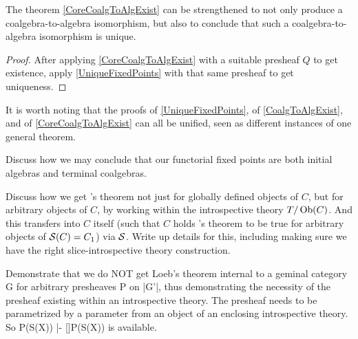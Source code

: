 \begin{theorem}
The theorem \cref{CoreCoalgToAlgExist} can be strengthened to not only produce a coalgebra-to-algebra isomorphism, but also to conclude that such a coalgebra-to-algebra isomorphism is unique.
\end{theorem}
\begin{proof}
After applying \cref{CoreCoalgToAlgExist} with a suitable presheaf $Q$ to get existence, apply \cref{UniqueFixedPoints} with that same presheaf to get uniqueness.
\end{proof}

It is worth noting that the proofs of \cref{UniqueFixedPoints}, of \cref{CoalgToAlgExist}, and of \cref{CoreCoalgToAlgExist} can all be unified, seen as different instances of one general theorem. 

\begin{TODOblock}
Discuss how we may conclude that our functorial fixed points are both initial algebras and terminal coalgebras.
\end{TODOblock}

\begin{TODOblock}
Discuss how we get \Loeb's theorem not just for globally defined objects of $C$, but for arbitrary objects of $C$, by working within the introspective theory $T/\operatorname{Ob}(C)$. And this transfers into $C$ itself (such that $C$ holds \Loeb's theorem to be true for arbitrary objects of $\mathcal{S}(C) = C_1$) via $\mathcal{S}$. Write up details for this, including making sure we have the right slice-introspective theory construction.
\end{TODOblock}

\begin{TODOblock}
Demonstrate that we do NOT get Loeb's theorem internal to a geminal category G for arbitrary presheaves P on |G'|, thus demonstrating the necessity of the presheaf existing within an introspective theory. The presheaf needs to be parametrized by a parameter from an object of an enclosing introspective theory. So P(S(X)) |- []P(S(X)) is available.
\end{TODOblock}